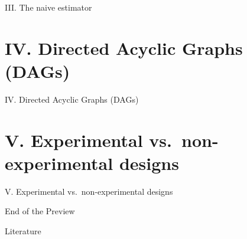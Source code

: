 \documentclass[
  ignorenonframetext,
]{beamer}
\begin{document}
\begin{frame}{III. The naive estimator}
\end{frame}

\hypertarget{iv.-directed-acyclic-graphs-dags}{%
\section{IV. Directed Acyclic Graphs
(DAGs)}\label{iv.-directed-acyclic-graphs-dags}}

\begin{frame}{IV. Directed Acyclic Graphs (DAGs)}
\end{frame}

\hypertarget{v.-experimental-vs.-non-experimental-designs}{%
\section{V. Experimental vs.~non-experimental
designs}\label{v.-experimental-vs.-non-experimental-designs}}

\begin{frame}{V. Experimental vs.~non-experimental designs}
\end{frame}

\begin{frame}{End of the Preview}
\protect\hypertarget{end-of-the-preview}{}
\end{frame}

\begin{frame}{Literature}
\protect\hypertarget{literature}{}
\end{frame}
\end{document}
